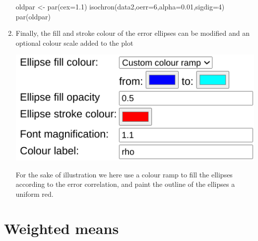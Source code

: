 \begin{refsection}
\begin{enumerate}
\begin{script}
oldpar <- par(cex=1.1)
isochron(data2,oerr=6,alpha=0.01,sigdig=4)
par(oldpar)
\end{script}

\item Finally, the fill and stroke colour of the error ellipses can be
  modified and an optional colour scale added to the plot

\noindent\begin{minipage}[t]{.45\linewidth}
  \strut\vspace*{-\baselineskip}\newline
  \includegraphics[width=\linewidth]{../figures/OtherRegressionFillStroke.png}
\end{minipage}
\begin{minipage}[t]{.55\linewidth}
For the sake of illustration we here use a colour ramp to fill the
ellipses according to the error correlation, and paint the outline of
the ellipses a uniform red.
\end{minipage}

  
\end{enumerate}

\section{Weighted means}\label{sec:OtherWeightedMean}


\end{refsection}
